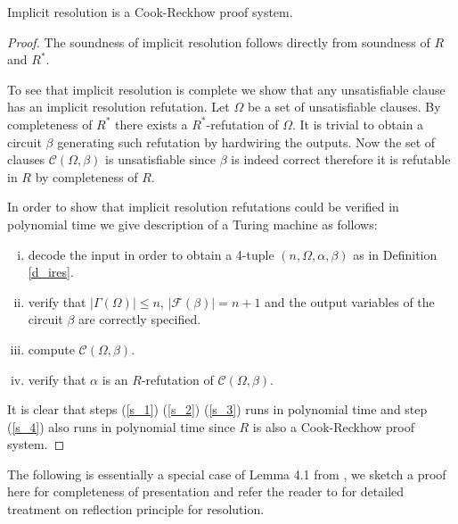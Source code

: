 \documentclass{LMCS}
\theoremstyle{plain}\newtheorem{satz}[thm]{Satz}
\begin{document}
\begin{lem}
Implicit resolution is a Cook-Reckhow proof system.
\begin{proof}
The soundness of implicit resolution follows directly from soundness of $R$ and $R^*$.

To see that implicit resolution is complete we show that any unsatisfiable clause has an implicit resolution refutation. Let $\Omega$ be a set of unsatisfiable clauses. By completeness of $R^*$ there exists a $R^*$-refutation of $\Omega$. It is trivial to obtain a circuit $\beta$ generating such refutation by hardwiring the outputs. Now the set of clauses ${\mathcal C}(\Omega, \beta)$ is unsatisfiable since $\beta$ is indeed correct therefore it is refutable in $R$ by completeness of $R$.

In order to show that implicit resolution refutations could be verified in polynomial time we give description of a Turing machine as follows:
\begin{enumerate}[(i)]
\item\label{s_1}
decode the input in order to obtain a 4-tuple $(n, \Omega, \alpha, \beta)$ as in Definition \ref{d_ires}.
\item\label{s_2}
verify that $|\Gamma(\Omega)| \leq n$, $|{\mathcal F}(\beta)| = n + 1$ and the output variables of the circuit $\beta$ are correctly specified.
\item\label{s_3}
compute ${\mathcal C}(\Omega,\beta)$.
\item\label{s_4}
verify that $\alpha$ is an $R$-refutation of ${\mathcal C}(\Omega,\beta)$.
\end{enumerate}

It is clear that steps (\ref{s_1}) (\ref{s_2}) (\ref{s_3}) runs in polynomial time and step (\ref{s_4}) also runs in polynomial time since $R$ is also a Cook-Reckhow proof system.
\end{proof}
\end{lem}

The following is essentially a special case of Lemma 4.1 from \cite{MR2058178}, we sketch a proof here for completeness of presentation and refer the reader to \cite{MR2039508} for detailed treatment on reflection principle for resolution.
\end{document}
